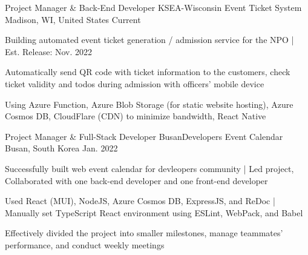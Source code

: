 

\begin{cventries}

  \cventry
  {Project Manager \& Back-End Developer} %
  {KSEA-Wisconsin Event Ticket System} %
  {Madison, WI, United States} %
  {Current} %
  {
    \begin{cvitems} %
      \item {Building automated event ticket generation / admission service for the NPO | Est. Release: Nov. 2022}
      \item {Automatically send QR code with ticket information to the customers, check ticket validity and todos during admission with officers' mobile device}
      \item {Using Azure Function, Azure Blob Storage (for static website hosting), Azure Cosmos DB, CloudFlare (CDN) to minimize bandwidth, React Native}
    \end{cvitems}
  }

  \cventry
  {Project Manager \& Full-Stack Developer} %
  {BusanDevelopers Event Calendar} %
  {Busan, South Korea} %
  {Jan. 2022} %
  {
    \begin{cvitems} %
      \item {Successfully built web event calendar for devleopers community | Led project, Collaborated with one back-end developer and one front-end developer}
      \item {Used React (MUI), NodeJS, Azure Cosmos DB, ExpressJS, and ReDoc | Manually set TypeScript React environment using ESLint, WebPack, and Babel}
      \item {Effectively divided the project into smaller milestones, manage teammates' performance, and conduct weekly meetings}
    \end{cvitems}
  }


\end{cventries}
